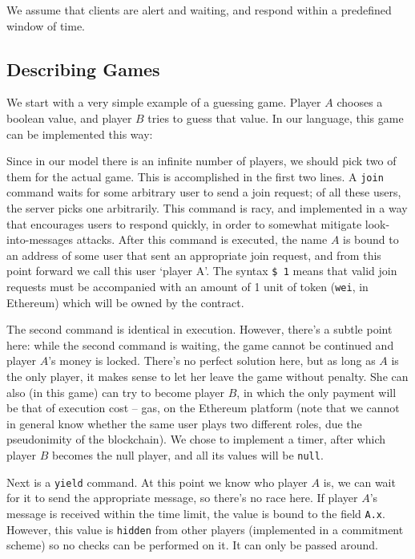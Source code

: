 \documentclass[acmsmall,review,anonymous]{acmart}\settopmatter{printfolios=true,printccs=false,printacmref=false}
\begin{document}
We assume that clients are alert and waiting, and respond within a predefined window of time.


\subsection{Describing Games}
We start with a very simple example of a guessing game. Player $A$ chooses a boolean value, and player $B$ tries to guess that value.
In our language, this game can be implemented this way:



Since in our model there is an infinite number of players, we should pick two of them for the actual game. This is accomplished in the first two lines. A \texttt{join} command waits for some arbitrary user to send a join request; of all these users, the server picks one arbitrarily. This command is racy, and implemented in a way that encourages users to respond quickly, in order to somewhat mitigate look-into-messages attacks. After this command is executed, the name $A$ is bound to an address of some user that sent an appropriate join request, and from this point forward we call this user `player A'. The syntax \texttt{\$ 1} means that valid join requests must be accompanied with an amount of 1 unit of token (\texttt{wei}, in Ethereum) which will be owned by the contract.

The second command is identical in execution. However, there's a subtle point here: while the second command is waiting, the game cannot be continued and player $A$'s money is locked. There's no perfect solution here, but as long as $A$ is the only player, it makes sense to let her leave the game without penalty. She can also (in this game) can try to become player $B$, in which the only payment will be that of execution cost -- gas, on the Ethereum platform (note that we cannot in general know whether the same user plays two different roles, due the pseudonimity of the blockchain). We chose to implement a timer, after which player $B$ becomes the null player, and all its values will be \texttt{null}.

Next is a \texttt{yield} command. At this point we know who player $A$ is, we can wait for it to send the appropriate message, so there's no race here. If player $A$'s message is received within the time limit, the value is bound to the field \texttt{A.x}. However, this value is \texttt{hidden} from other players (implemented in a commitment scheme) so no checks can be performed on it. It can only be passed around.
\end{document}
